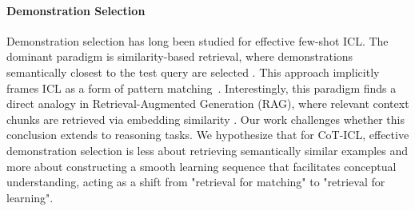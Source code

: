 \documentclass{article}
\theoremstyle{plain}
\theoremstyle{definition}
\theoremstyle{remark}
\begin{document}
\paragraph{Demonstration Selection}
Demonstration selection has long been studied for effective few-shot ICL. The dominant paradigm is similarity-based retrieval, where demonstrations semantically closest to the test query are selected \cite{liu-etal-2022-makes, wu-etal-2023-self, kapuriya2025exploringrolediversityexample}. This approach implicitly frames ICL as a form of pattern matching~\cite{olsson2022incontextlearninginductionheads, crosbie-shutova-2025-induction, yu-etal-2025-stochastic}. Interestingly, this paradigm finds a direct analogy in Retrieval-Augmented Generation (RAG), where relevant context chunks are retrieved via embedding similarity \cite{lewis2020retrieval}. Our work challenges whether this conclusion extends to reasoning tasks. We hypothesize that for CoT-ICL, effective demonstration selection is less about retrieving semantically similar examples and more about constructing a smooth learning sequence that facilitates conceptual understanding, acting as a shift from "retrieval for matching" to "retrieval for learning".











\end{document}

